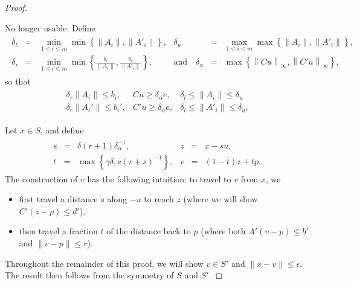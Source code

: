
\begin{proof}
\begin{boxedcomment}
No longer usable:
Define
\begin{align*}
\begin{array}{cccccc}
\delta_l &=& \min_{1\le i\le m} \min\left\{ \left\|A_i\right\|, \left\|A'_i\right\| \right\},  &
\delta_u &=& \max_{1\le i\le m} \max\left\{ \left\|A_i\right\|, \left\|A'_i\right\| \right\}, \\
\delta_r &=& \min_{1\le i\le m} \min\left\{ \frac{b_i}{\left\|A_i\right\|}, \frac{b_i}{\left\|A'_i\right\|} \right\}, &
\textrm{and} \quad \delta_{\alpha} &=& \max \left\{ \left\|Cu\right\|_{\infty}, \left\|C'u\right\|_{\infty} \right\},
\end{array}
\end{align*}
so that
\begin{align*}
\begin{array}{cccc}
\delta_r \|A_i\| \le b_i,			&
Cu \ge \delta_{\alpha} e,			&
\delta_l \le \|A_i\| \le \delta_u	\\
\delta_r \|A_i'\| \le b_i',			&
C'u \ge \delta_{\alpha} e, 			&
\delta_l \le \|A'_i\| \le \delta_u.
\end{array}
\end{align*}
\end{boxedcomment}

Let $x \in S$, and define
\begin{align*}
\begin{array}{cccccc}
s &=& \delta(r + 1)\delta_{\alpha}^{-1}, &
z &=& x - su, \\
t &=& \max\left\{\gamma \delta, s(r+s)^{-1}\right\}, &
v &=& (1-t)z + t p.
\end{array}
\end{align*}
The construction of $v$ has the following intuition:
to travel to $v$ from $x$, we
\begin{itemize}
\item first travel a distance $s$ along $-u$ to reach $z$ (where we will show $C'(z-p) \le d'$),
\item then travel a fraction $t$ of the distance back to $p$ (where both $A'(v - p) \le b'$ and $\|v-p\| \le r$).
\end{itemize}
Throughout the remainder of this proof, we will show $v \in S'$ and $\|x - v\| \le \epsilon$.
The result then follows from the symmetry of $S$ and $S'$.



\end{proof}
